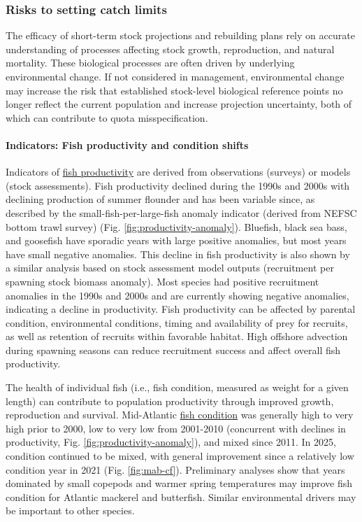 \documentclass[
  10pt,
]{article}
\begin{document}
\subsubsection{Risks to setting catch limits}\label{risks-to-setting-catch-limits}

The efficacy of short-term stock projections and rebuilding plans rely on accurate understanding of processes affecting stock growth, reproduction, and natural mortality. These biological processes are often driven by underlying environmental change. If not considered in management, environmental change may increase the risk that established stock-level biological reference points no longer reflect the current population and increase projection uncertainty, both of which can contribute to quota misspecification.

\paragraph{Indicators: Fish productivity and condition shifts}\label{indicators-fish-productivity-and-condition-shifts}

Indicators of \href{https://noaa-edab.github.io/catalog/productivity_anomaly.html}{fish productivity} are derived from observations (surveys) or models (stock assessments). Fish productivity declined during the 1990s and 2000s with declining production of summer flounder and has been variable since, as described by the small-fish-per-large-fish anomaly indicator (derived from NEFSC bottom trawl survey) (Fig. \ref{fig:productivity-anomaly}). Bluefish, black sea bass, and goosefish have sporadic years with large positive anomalies, but most years have small negative anomalies. This decline in fish productivity is also shown by a similar analysis based on stock assessment model outputs (recruitment per spawning stock biomass anomaly). Most species had positive recruitment anomalies in the 1990s and 2000s and are currently showing negative anomalies, indicating a decline in productivity. Fish productivity can be affected by parental condition, environmental conditions, timing and availability of prey for recruits, as well as retention of recruits within favorable habitat. High offshore advection during spawning seasons can reduce recruitment success and affect overall fish productivity.

The health of individual fish (i.e., fish condition, measured as weight for a given length) can contribute to population productivity through improved growth, reproduction and survival. Mid-Atlantic \href{https://noaa-edab.github.io/catalog/condition.html}{fish condition} was generally high to very high prior to 2000, low to very low from 2001-2010 (concurrent with declines in productivity, Fig. \ref{fig:productivity-anomaly}), and mixed since 2011. In 2025, condition continued to be mixed, with general improvement since a relatively low condition year in 2021 (Fig. \ref{fig:mab-cf}). Preliminary analyses show that years dominated by small copepods and warmer spring temperatures may improve fish condition for Atlantic mackerel and butterfish. Similar environmental drivers may be important to other species.
\end{document}
